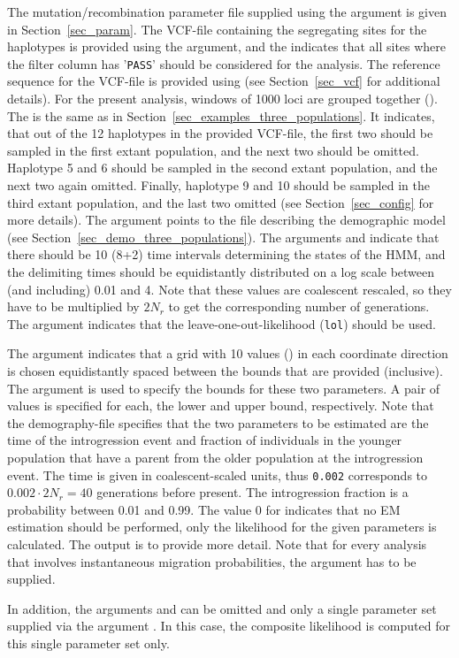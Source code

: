 \documentclass{article}
\numberwithin{equation}{section}
\begin{document}
The mutation/recombination parameter file supplied using the  argument is given in Section~\ref{sec_param}. The VCF-file containing the segregating sites for the haplotypes is provided using the  argument, and the  indicates that all sites where the filter column has '\texttt{PASS}' should be considered for the analysis. The reference sequence for the VCF-file is provided using  (see Section~\ref{sec_vcf} for additional details). For the present analysis, windows of 1000 loci are grouped together (). The  is the same as in Section~\ref{sec_examples_three_populations}. It indicates, that out of the 12 haplotypes in the provided VCF-file, the first two should be sampled in the first extant population, and the next two should be omitted. Haplotype 5 and 6 should be sampled in the second extant population, and the next two again omitted. Finally, haplotype 9 and 10 should be sampled in the third extant population, and the last two omitted (see Section~\ref{sec_config} for more details). The argument  points to the file describing the demographic model (see Section~\ref{sec_demo_three_populations}). The arguments  and  indicate that there should be 10 (8+2) time intervals determining the states of the HMM, and the delimiting times should be equidistantly distributed on a log scale between (and including) 0.01 and 4. Note that these values are coalescent rescaled, so they have to be multiplied by $2N_r$ to get the corresponding number of generations. The argument  indicates that the leave-one-out-likelihood (\texttt{lol}) should be used.

The argument  indicates that a grid with 10 values () in each coordinate direction is chosen equidistantly spaced between the bounds that are provided (inclusive). The argument  is used to specify the bounds for these two parameters. A pair of values is specified for each, the lower and upper bound, respectively. Note that the demography-file specifies that the two parameters to be estimated are the time of the introgression event and fraction of individuals in the younger population that have a parent from the older population at the introgression event. The time is given in coalescent-scaled units, thus \texttt{0.002} corresponds to $0.002 \cdot 2 N_r = 40$ generations before present. The introgression fraction is a probability between 0.01 and 0.99. The value 0 for  indicates that no EM estimation should be performed, only the likelihood for the given parameters is calculated. The output is  to provide more detail. Note that for every analysis that involves instantaneous migration probabilities, the argument  has to be supplied.

In addition, the arguments  and  can be omitted and only a single parameter set supplied via the argument . In this case, the composite likelihood is computed for this single parameter set only.

 

\end{document}
